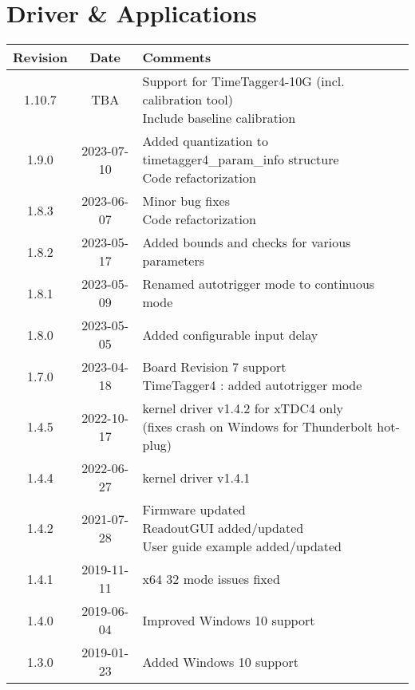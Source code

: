 \section{Driver \& Applications} \label{sec:rev_driver_applications}
\begin{tabularx}{\textwidth}{|c|c|X|}
    \hline
    Revision & Date & Comments\\
    \hline\hline
    \hypertarget{drvrev}{1.10.7} & TBA &
    \makecell[l] {
        Support for TimeTagger4-10G (incl. calibration tool)\\*
        Include baseline calibration
    }\\   
    \hline
    1.9.0 & 2023-07-10 &
    \makecell[l] {
       Added quantization to timetagger4\_param\_info structure \\*
       Code refactorization\\*   
    }\\   
    \hline
    {1.8.3} & 2023-06-07 &
    \makecell[l] {
        Minor bug fixes\\*
        Code refactorization\\*        
    }\\
    \hline
    {1.8.2} & 2023-05-17 &
    \makecell[l] {
        Added bounds and checks for various parameters\\*         
    }\\
    \hline
    {1.8.1} & 2023-05-09 &
    \makecell[l] {
     Renamed autotrigger mode to continuous mode  \\*  
    }\\
    \hline
    {1.8.0} & 2023-05-05 &
    \makecell[l] {
        Added configurable input delay\\*
    }\\
    \hline
    {1.7.0} & 2023-04-18 &
    \makecell[l] {
        Board Revision 7 support\\* 
        TimeTagger4 : added autotrigger mode\\*
    }\\
    \hline
    {1.4.5} & 2022-10-17 &
    \makecell[l] {
        kernel driver v1.4.2 for xTDC4 only\\* 
        (fixes crash on Windows for Thunderbolt hot-plug)\\*
    }\\
    \hline
    {1.4.4} & 2022-06-27 &
        kernel driver v1.4.1\\
    \hline
    1.4.2 & 2021-07-28 &
    \makecell[l]{
        Firmware updated \\*
        ReadoutGUI added/updated \\*
        User guide example added/updated \\*
    }\\
    \hline
    {1.4.1} & 2019-11-11 & x64 32 mode issues fixed\\
    \hline
    {1.4.0} & 2019-06-04 & Improved Windows 10 support\\
    \hline
    {1.3.0} & 2019-01-23 & Added Windows 10 support\\
    \hline
\end{tabularx}